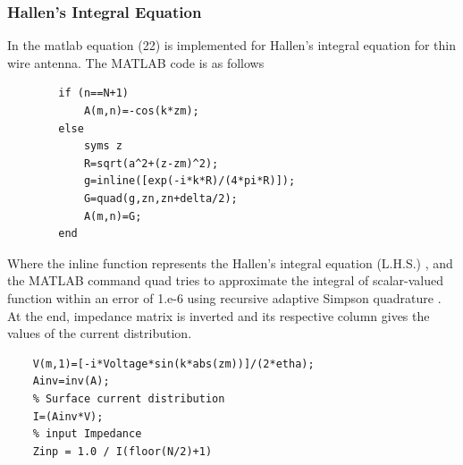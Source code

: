 \documentclass[aps,prstab,twocolumn,superscriptaddress,groupedaddress,showkeys,nofootinbib]{revtex4}  %
\begin{document}
\subsubsection{Hallen's Integral Equation}
In the matlab equation (22) is implemented for Hallen's integral equation for thin wire antenna. The MATLAB code is as follows
\begin{lstlisting}
        if (n==N+1)
            A(m,n)=-cos(k*zm);
        else
            syms z
            R=sqrt(a^2+(z-zm)^2);
            g=inline([exp(-i*k*R)/(4*pi*R)]);
            G=quad(g,zn,zn+delta/2);
            A(m,n)=G;
        end
\end{lstlisting}
Where the inline function represents the Hallen's integral equation (L.H.S.) , and the MATLAB command quad tries to approximate the integral of scalar-valued function within an error of 1.e-6 using recursive adaptive Simpson quadrature \cite{matlab}.\\
At the end, impedance matrix is inverted and its respective column gives the values of the current distribution. 
\begin{lstlisting}
	V(m,1)=[-i*Voltage*sin(k*abs(zm))]/(2*etha);
	Ainv=inv(A);
	% Surface current distribution
	I=(Ainv*V);
	% input Impedance
	Zinp = 1.0 / I(floor(N/2)+1)
\end{lstlisting}
\end{document}
